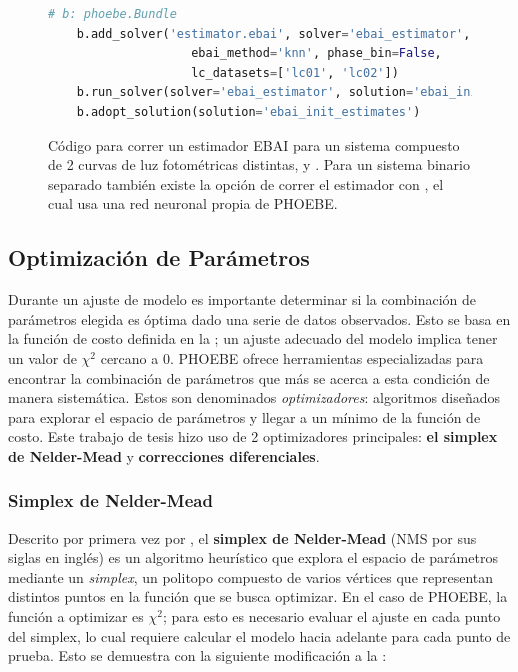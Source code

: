 \begin{figure}[!ht]
	\begin{lstlisting}[language=Python, autogobble]
	# b: phoebe.Bundle
	b.add_solver('estimator.ebai', solver='ebai_estimator', 
					ebai_method='knn', phase_bin=False, 
					lc_datasets=['lc01', 'lc02'])
	b.run_solver(solver='ebai_estimator', solution='ebai_init_estimates')
	b.adopt_solution(solution='ebai_init_estimates')
	\end{lstlisting}
	\caption{Código para correr un estimador EBAI para un sistema compuesto de 2
	curvas de luz fotométricas distintas,  y . Para un
	sistema binario separado también existe la opción de correr el estimador con
	, el cual usa una red neuronal propia de PHOEBE.}
\end{figure}

\subsection{Optimización de Parámetros}

Durante un ajuste de modelo es importante determinar si la combinación de
parámetros elegida es óptima dado una serie de datos observados. Esto se basa en
la función de costo definida en la ; un ajuste
adecuado del modelo implica tener un valor de $\chi^2$ cercano a 0. PHOEBE
ofrece herramientas especializadas para encontrar la combinación de parámetros
que más se acerca a esta condición de manera sistemática. Estos son denominados
\textit{optimizadores}: algoritmos diseñados para explorar el espacio de
parámetros y llegar a un mínimo de la función de costo. Este trabajo de tesis
hizo uso de 2 optimizadores principales: \textbf{el simplex de Nelder-Mead} y
\textbf{correcciones diferenciales}.

\subsubsection{Simplex de Nelder-Mead} \label{intro:phoebe:nelder_mead}

Descrito por primera vez por , el
\textbf{simplex de Nelder-Mead} (NMS por sus siglas en inglés) es un algoritmo
heurístico que explora el espacio de parámetros mediante un \textit{simplex}, un
politopo compuesto de varios vértices que representan distintos puntos en la
función que se busca optimizar. En el caso de PHOEBE, la función a optimizar es
$\chi^2$; para esto es necesario evaluar el ajuste en cada punto del simplex, lo
cual requiere calcular el modelo hacia adelante para cada punto de prueba. Esto
se demuestra con la siguiente modificación a la :

